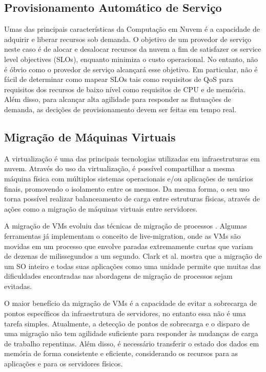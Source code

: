 	\subsection{Provisionamento Automático de Serviço}
	Umas das principais características da Computação em Nuvem é a capacidade de adquirir e liberar recursos sob demanda. O objetivo de um provedor de serviço neste caso é de alocar e desalocar recursos da nuvem a fim de satisfazer os service level objectives (SLOs), enquanto minimiza o custo operacional.  No entanto, não é óbvio como o provedor de serviço alcançará esse objetivo. Em particular, não é fácil de determinar como mapear SLOs tais como requisitos de QoS para requisitos dos recursos de baixo nível como requisitos de CPU e de memória. Além disso, para alcançar alta agilidade para responder as flutuações de demanda, as decições de provisionamento devem ser feitas em tempo real.
	
	\subsection{Migração de Máquinas Virtuais}
	A virtualização é uma das principais tecnologias utilizadas em infraestruturas em nuvem. Através do uso da virtualização, é possível compartilhar a mesma máquina física com múltiplos sistemas operacionais e/ou aplicações de usuários finais, promovendo o isolamento entre os mesmos. Da mesma forma, o seu uso torna possível realizar balanceamento de carga entre estruturas físicas, através de ações como a migração de máquinas virtuais entre servidores.
	
	A migração de VMs evoluiu das técnicas de migração de processos \cite{Osman:2002}. Algumas ferramentas já implementam o conceito de live-migration, onde as VMs são movidas em um processo que envolve paradas extremamente curtas que variam de dezenas de milissegundos a um segundo. Clark et al. \cite{Clark:2005} mostra que a migração de um SO inteiro e todas suas aplicações como uma unidade permite que muitas das dificuldades encontradas nas abordagens de migração de processos sejam evitadas.
	 
	O maior benefício da migração de VMs é a capacidade de evitar a sobrecarga de pontos específicos da infraestrutura de servidores, no entanto essa não é uma tarefa simples. Atualmente, a detecção de pontos de sobrecarga e o disparo de uma migração não tem agilidade suficiente para responder às mudanças de carga de trabalho repentinas. Além disso, é necessário transferir o estado dos dados em memória de forma consistente e eficiente, considerando os recursos para as aplicações e para os servidores físicos. 
	
